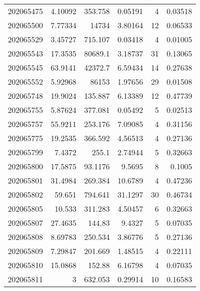\begin{tabular}{rrrrrr}
 202065475 &          4.10092 &      353.758  &            0.05191 &           4 & 0.03518 \\
 202065500 &          7.77334 &    14734      &            3.80164 &          12 & 0.06533 \\
 202065529 &          3.45727 &      715.107  &            0.03418 &           4 & 0.01005 \\
 202065543 &         17.3535  &    80689.1    &            3.18737 &          31 & 0.13065 \\
 202065545 &         63.9141  &    42372.7    &            6.59434 &          14 & 0.27638 \\
 202065552 &          5.92968 &    86153      &            1.97656 &          29 & 0.01508 \\
 202065748 &         19.9024  &      135.887  &            6.13389 &          12 & 0.47739 \\
 202065755 &          5.87624 &      377.081  &            0.05492 &           5 & 0.02513 \\
 202065757 &         55.9211  &      253.176  &            7.09085 &           4 & 0.31156 \\
 202065775 &         19.2535  &      366.592  &            4.56513 &           4 & 0.27136 \\
 202065799 &          7.4372  &      255.1    &            2.74944 &           5 & 0.32663 \\
 202065800 &         17.5875  &       93.1176 &            9.5695  &           8 & 0.1005  \\
 202065801 &         31.4984  &      269.384  &           10.6789  &           4 & 0.47236 \\
 202065802 &         59.651   &      794.641  &           31.1297  &          30 & 0.46734 \\
 202065805 &         10.533   &      311.283  &            4.50457 &           6 & 0.32663 \\
 202065807 &         27.4635  &      144.83   &            9.4327  &           5 & 0.07035 \\
 202065808 &          8.69783 &      250.534  &            3.86776 &           5 & 0.27136 \\
 202065809 &          7.29847 &      201.669  &            1.48515 &           4 & 0.22111 \\
 202065810 &         15.0868  &      152.88   &            6.16798 &           4 & 0.07035 \\
 202065811 &          3       &      632.053  &            0.29914 &          10 & 0.16583 \\

\end{tabular}
